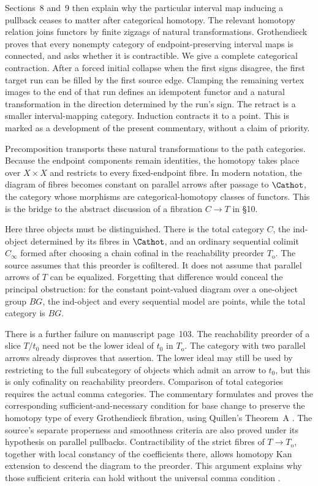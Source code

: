 Sections~8 and~9 then explain why the particular interval map inducing a pullback ceases to matter after categorical homotopy.  The relevant homotopy relation joins functors by finite zigzags of natural transformations.  Grothendieck proves that every nonempty category of endpoint-preserving interval maps is connected, and asks whether it is contractible.  We give a complete categorical contraction.  After a forced initial collapse when the first signs disagree, the first target run can be filled by the first source edge.  Clamping the remaining vertex images to the end of that run defines an idempotent functor and a natural transformation in the direction determined by the run's sign.  The retract is a smaller interval-mapping category.  Induction contracts it to a point.  This is marked as a development of the present commentary, without a claim of priority.

Precomposition transports these natural transformations to the path categories.  Because the endpoint components remain identities, the homotopy takes place over $X\times X$ and restricts to every fixed-endpoint fibre.  In modern notation, the diagram of fibres becomes constant on parallel arrows after passage to $\Cathot$, the category whose morphisms are categorical-homotopy classes of functors.  This is the bridge to the abstract discussion of a fibration $C\to T$ in \S10.

Here three objects must be distinguished.  There is the total category $C$, the ind-object determined by its fibres in $\Cathot$, and an ordinary sequential colimit $C_\infty$ formed after choosing a chain cofinal in the reachability preorder $T_{\mathrm o}$.  The source assumes that this preorder is cofiltered.  It does not assume that parallel arrows of $T$ can be equalized.  Forgetting that difference would conceal the principal obstruction: for the constant point-valued diagram over a one-object group $BG$, the ind-object and every sequential model are points, while the total category is $BG$.

There is a further failure on manuscript page~103.  The reachability preorder of a slice $T/t_0$ need not be the lower ideal of $t_0$ in $T_{\mathrm o}$.  The category with two parallel arrows already disproves that assertion.  The lower ideal may still be used by restricting to the full subcategory of objects which admit an arrow to $t_0$, but this is only cofinality on reachability preorders.  Comparison of total categories requires the actual comma categories.  The commentary formulates and proves the corresponding sufficient-and-necessary condition for base change to preserve the homotopy type of every Grothendieck fibration, using Quillen's Theorem~A \citep[\S1]{Quillen1973}.  The source's separate properness and smoothness criteria are also proved under its hypothesis on parallel pullbacks.  Contractibility of the strict fibres of $T\to T_{\mathrm o}$, together with local constancy of the coefficients there, allows homotopy Kan extension to descend the diagram to the preorder.  This argument explains why those sufficient criteria can hold without the universal comma condition \citep{Maltsiniotis2005Asphericite,Cisinski2009LocallyConstant}.

